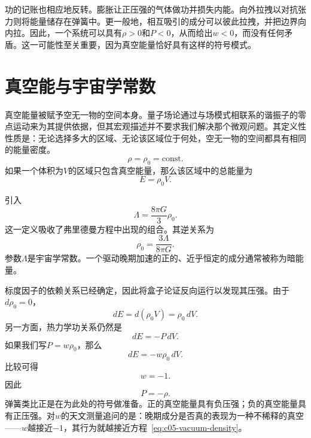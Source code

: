 功的记账也相应地反转。膨胀让正压强的气体做功并损失内能。向外拉拽以对抗张力则将能量储存在弹簧中。更一般地，相互吸引的成分可以彼此拉拽，并把边界向内拉。因此，一个系统可以具有\(\rho>0\)和\(P<0\)，从而给出\(w<0\)，而没有任何矛盾。这一可能性至关重要，因为真空能量恰好具有这样的符号模式。

\section{真空能与宇宙学常数}

真空能量被赋予空无一物的空间本身。量子场论通过与场模式相联系的谐振子的零点运动来为其提供依据，但其宏观描述并不要求我们解决那个微观问题。其定义性性质是：无论选择多大的区域、无论该区域位于何处，空无一物的空间都具有相同的能量密度。
\begin{equation}
\rho=\rho_0=\text{const.}
\label{eq:c05-vacuum-density}
\end{equation}
如果一个体积为\(V\)的区域只包含真空能量，那么该区域中的总能量为
\begin{equation}
E=\rho_0 V.
\end{equation}
\begin{classroomqa}
\end{classroomqa}

引入
\begin{equation}
\Lambda=\frac{8\pi G}{3}\rho_0.
\label{eq:c05-lambda-definition}
\end{equation}
这一定义吸收了弗里德曼方程中出现的组合。其逆关系为
\begin{equation}
\rho_0=\frac{3\Lambda}{8\pi G}.
\end{equation}
参数\(\Lambda\)是宇宙学常数。一个驱动晚期加速的正的、近乎恒定的成分通常被称为暗能量。

标度因子的依赖关系已经确定，因此将盒子论证反向运行以发现其压强。由于\(d\rho_0=0\)，
\begin{equation}
dE=d(\rho_0V)=\rho_0\,dV.
\end{equation}
另一方面，热力学功关系仍然是
\begin{equation}
dE=-P\,dV.
\end{equation}
如果我们写\(P=w\rho_0\)，那么
\begin{equation}
dE=-w\rho_0\,dV.
\end{equation}
比较可得
\begin{equation}
w=-1.
\end{equation}
因此
\begin{equation}
P=-\rho.
\end{equation}
弹簧类比正是在为此处的符号做准备。正的真空能量具有负压强；负的真空能量具有正压强。对\(w\)的天文测量追问的是：晚期成分是否真的表现为一种不稀释的真空——\(w\)越接近\(-1\)，其行为就越接近方程~\eqref{eq:c05-vacuum-density}。

